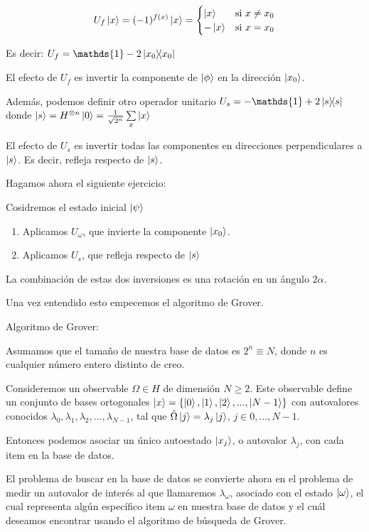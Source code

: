 \[U_f \ket{x} = (-1)^{f(x)} \ket{x} =
    \begin{cases}
      \ket{x} & \text{si } x \neq x_0 \\
      - \ket{x} & \text{si } x = x_0
    \end{cases}\]

Es decir: $U_f = \mathds{1} - 2 \ketbra{x_0}{x_0}$
  
El efecto de $U_f$ es invertir la componente de $\ket{\phi}$ en la dirección
$\ket{x_0}$.

Además, podemos definir otro operador unitario $U_s = -\mathds{1} + 2
\ketbra{s}{s}$ donde $\ket{s} = H^{\otimes n} \ket{0} = \frac{1}{\sqrt{2^n}}
\sum\limits_x \ket{x}$

El efecto de $U_s$ es invertir todas las componentes en direcciones
perpendiculares a $\ket{s}$. Es decir, refleja respecto de $\ket{s}$.

Hagamos ahora el siguiente ejercicio:

Cosidremos el estado inicial $\ket{\psi}$

\begin{enumerate}
\item Aplicamos $U_\omega$, que invierte la componente $\ket{x_0}$.
\item Aplicamos $U_s$, que refleja respecto de $\ket{s}$
\end{enumerate}

La combinación de estas dos inversiones es una rotación en un ángulo $2\alpha$.


Una vez entendido esto empecemos el algoritmo de Grover.

Algoritmo de Grover:

Asumamos que el tamaño de nuestra base de datos es $2^n \equiv N$, donde $n$ es cualquier número entero distinto de creo.

Consideremos un observable $\Omega \in H$ de dimensión $N \geq 2$. Este
observable define un conjunto de bases ortogonales $\ket{x} = \{\ket{0},
\ket{1}, \ket{2},...,\ket{N-1}\}$ con autovalores conocidos $\lambda_0,
\lambda_1, \lambda_2,..., \lambda_{N-1}$, tal que $\hat{\Omega} \ket{j} =
\lambda_j \ket{j}$, $j \in {0,...,N-1}$.

Entonces podemos asociar un único autoestado $\ket{x_j}$, o autovalor
$\lambda_j$, con cada item en la base de datos.

El problema de buscar en la base de datos se convierte ahora en el problema de
medir un autovalor de interés al que llamaremos $\lambda_\omega$, asociado con
el estado $\ket{\omega}$, el cual representa algún específico item $\omega$ en
nuestra base de datos y el cuál deseamos encontrar usando el algoritmo de
búsqueda de Grover.

